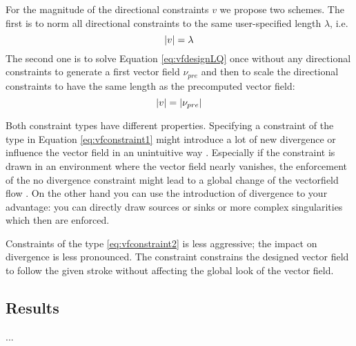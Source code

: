 For the magnitude of the directional constraints $v$ we propose two schemes. The first is to norm all directional constraints to the same user-specified length $\lambda$, i.e.
\begin{equation} \left| v \right| = \lambda \label{eq:vfconstraint1}\end{equation}
The second one is to solve Equation \ref{eq:vfdesignLQ} once without any directional constraints to generate a first vector field $\nu_{pre}$ and then to scale the directional constraints to have the same length as the precomputed vector field:
\begin{equation} \left| v \right| = \left| \nu_{pre} \right| \label{eq:vfconstraint2}\end{equation}

Both constraint types have different properties. Specifying a constraint of the type in Equation \ref{eq:vfconstraint1} might introduce a lot of new divergence or influence the vector field in an unintuitive way . Especially if the constraint is drawn in an environment where the vector field nearly vanishes, the enforcement of the no divergence constraint might lead to a global change of the vectorfield flow . On the other hand you can use the introduction of divergence to your advantage: you can directly draw sources or sinks or more complex singularities which then are enforced.

Constraints of the type \ref{eq:vfconstraint2} is less aggressive; the impact on divergence is less pronounced. The constraint constrains the designed vector field to follow the given stroke without affecting the global look of the vector field.

\subsection{Results}
...

